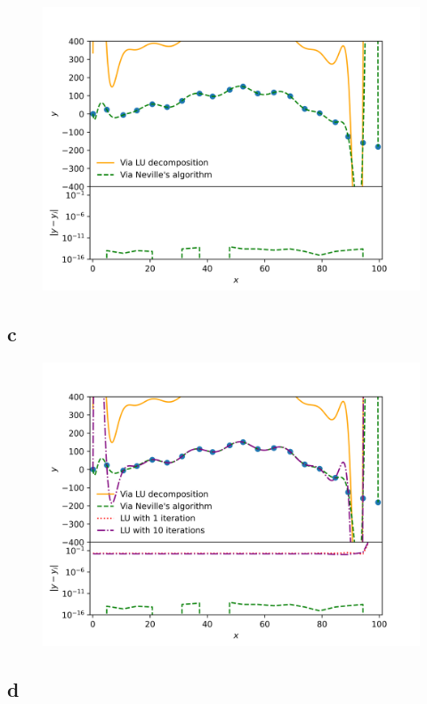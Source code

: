 \begin{figure}[h!]
    \centering
    \includegraphics[width=0.9\linewidth]{./my_vandermonde_sol_2b.png}
    \caption{}
    \label{fig:2b}
\end{figure}

\subsection{c}


\begin{figure}[h!]
    \centering
    \includegraphics[width=0.9\linewidth]{./my_vandermonde_sol_2c.png}
    \caption{}
    \label{fig:2c}
\end{figure}

\subsection{d}

